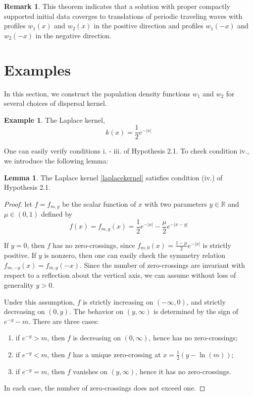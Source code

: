\documentclass[11pt]{article}
\theoremstyle{definition}
\newtheorem{lem}[thm]{Lemma}
\newtheorem{rem}[thm]{Remark}
\newtheorem{ex}[thm]{Example}
\numberwithin{equation}{section}
\numberwithin{thm}{section}
\begin{document}
\begin{rem}
This theorem indicates that a solution with proper compactly supported initial data coverges to translations of periodic traveling waves with profiles $w_1(x)$ and $w_2(x)$ in the positive direction and profiles $w_1(-x)$ and $w_2(-x)$ in the negative direction.
\end{rem}

\section{Examples}

In this section, we construct the population density functions $w_1$ and $w_2$ for several choices of dispersal kernel.

\begin{ex}
The Laplace kernel,
\begin{equation}\label{laplacekernel}
k(x) = \frac{1}{2} e^{-|x|}
\end{equation}

One can easily verify conditions i. - iii. of Hypothesis 2.1. To check condition iv., we introduce the following lemma:

\begin{lem}
The Laplace kernel \eqref{laplacekernel} satisfies condition (iv.) of Hypothesis 2.1.
\end{lem}

\begin{proof}
let $f=f_{m,y}$ be the scalar function of $x$ with two parameters $y\in\mathbb R$ and $\mu\in(0,1)$ defined by
$$ f(x)= f_{m,y}(x) = \frac{1}{2} e^{-|x|} - \frac{\mu}{2}e^{-|x-y|} $$

If $y=0$, then $f$ has no zero-crossings, since $f_{m,0}(x)=\frac{1-\mu}{2}e^{-|x|}$ is strictly positive. If $y$ is nonzero, then one can easily check the symmetry relation $f_{m,-y}(x)=f_{m,y}(-x)$. Since the number of zero-crossings are invariant with respect to a reflection about the vertical axis, we can assume without loss of generality $y>0$.

Under this assumption, $f$ is strictly increasing on $(-\infty,0)$, and strictly decreasing on $(0,y)$. The behavior on $(y,\infty)$ is determined by the sign of $e^{-y}-m$. There are three cases:

\begin{enumerate}
\item if $e^{-y}>m$, then $f$ is decreasing on $(0,\infty)$, hence has no zero-crossings;
\item if $e^{-y}<m$, then $f$ has a unique zero-crossing at $x=\frac{1}{2}(y-\ln(m))$;
\item if $e^{-y}=m$, then $f$ vanishes on $(y,\infty)$, hence it has no zero-crossings.
\end{enumerate}
In each case, the number of zero-crossings does not exceed one.
\end{proof}


\end{ex}
\end{document}
